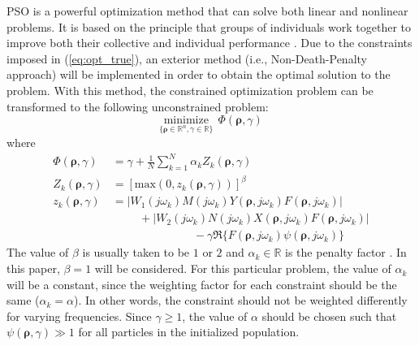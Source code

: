 \documentclass[letterpaper, 10 pt, conference]{ieeeconf}  %
\begin{document}
\iffalse
PSO is a powerful optimization method that can solve both linear and nonlinear problems. It is based on the principle that groups of individuals work together to improve both their collective and individual performance \cite{Sim13}. Due to the constraints imposed in (\ref{eq:opt_true}), an exterior method (i.e., Non-Death-Penalty approach) will be implemented in order to obtain the optimal solution to the problem. With this method, the constrained optimization problem can be transformed to the following unconstrained problem:
\begin{equation} \label{eq:pso_obj}
\underset{ \{ \bm{\rho}\in \mathbb{R}^n,\gamma \in \mathbb{R}\}}{\text{minimize}} \ \ \Phi(\bm{\rho},\gamma)
\end{equation}
where
\begin{equation} \label{eq:pso_hinf}
\begin{aligned}
\Phi(\bm{\rho},\gamma) &= \gamma + \frac{1}{N}\sum_{k=1}^N \alpha_k Z_k(\bm{\rho},\gamma) \\
Z_k(\bm{\rho},\gamma) &= [\mbox{max}(0,z_k(\bm{\rho},\gamma))]^\beta \\
z_k(\bm{\rho},\gamma) &=   |W_1(j\omega_k)M(j\omega_k)Y(\bm{\rho},j\omega_k)F(\bm{\rho},j\omega_k)| \\ & \hspace{1cm}+ |W_2(j\omega_k) N(j\omega_k)X(\bm{\rho},j\omega_k)F(\bm{\rho},j\omega_k)|  \\ &\hspace{3cm} -  \gamma \Re\{F(\bm{\rho},j\omega_k)\psi(\bm{\rho},j\omega_k) \}  
\end{aligned}
\end{equation}
The value of $\beta$ is usually taken to be $1$ or $2$ and $\alpha_k \in \mathbb{R}$ is the penalty factor \cite{Sim13} . In this paper, $\beta=1$ will be considered. For this particular problem, the value of $\alpha_k$ will be a constant, since the weighting factor for each constraint should be the same ($\alpha_k=\alpha$). In other words, the constraint should not be weighted differently for varying frequencies. Since $\gamma \geq 1$, the value of $\alpha$ should be chosen such that $\psi(\bm{\rho},\gamma) \gg 1$ for all particles in the initialized population. 
\end{document}
